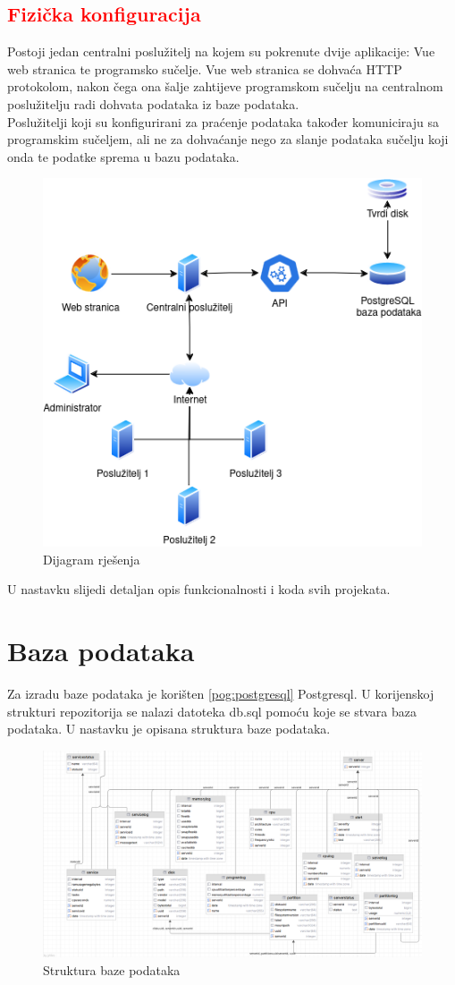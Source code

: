 \documentclass[zavrsnirad]{fer}
\begin{document}
\section{\textcolor{red}{Fizička konfiguracija}}
Postoji jedan centralni poslužitelj na kojem su pokrenute dvije aplikacije: Vue web stranica te programsko sučelje. Vue web stranica se dohvaća HTTP protokolom, nakon čega ona šalje zahtijeve programskom sučelju na centralnom poslužitelju radi dohvata podataka iz baze podataka.
\\Poslužitelji koji su konfigurirani za praćenje podataka također komuniciraju sa programskim sučeljem, ali ne za dohvaćanje nego za slanje podataka sučelju koji onda te podatke sprema u bazu podataka.
\begin{figure}[htb!]
	\centering
	\includegraphics[width=0.6\linewidth]{images/flowchart.png} 
	\caption{Dijagram rješenja}
	\label{slk:flowchart}
\end{figure}
\FloatBarrier
U nastavku slijedi detaljan opis funkcionalnosti i koda svih projekata.

\chapter{Baza podataka}
Za izradu baze podataka je korišten \ref{pog:postgresql} Postgresql. U korijenskoj strukturi repozitorija se nalazi datoteka db.sql pomoću koje se stvara baza podataka. U nastavku je opisana struktura baze podataka.
\begin{figure}[htb!]
	\centering
	\includegraphics[width=1.4\linewidth,angle=90]{images/db_structure.png} 
	\caption{Struktura baze podataka}
	\label{slk:db_structure}
\end{figure}
\FloatBarrier
\end{document}
